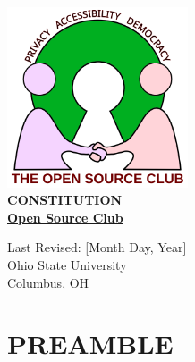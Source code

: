 \documentclass[12pt,letterpaper]{article}
\begin{document}
\renewcommand{\labelitemi}{\textcolor{accent}{\ding{68}}}
\renewcommand{\labelitemii}{\textcolor{accent}{\ding{67}}}
\renewcommand{\labelitemiii}{\textcolor{accent}{\ding{66}}}

\begin{titlepage}
\begin{center}
\vspace*{1cm}

\includegraphics[width=0.4\textwidth]{logo.png}\\[2cm]

{\LARGE\bfseries\color{accent} CONSTITUTION\\[0.5cm]}
{\huge\bfseries\color{accent} \underline{Open Source Club}\\[1cm]}

{\large Last Revised: [Month Day, Year]}\\[3cm]

\vfill
{\large Ohio State University}\\
{\large Columbus, OH}\\[1cm]
\end{center}
\end{titlepage}

\tableofcontents
\clearpage

\section*{PREAMBLE}
\end{document}
